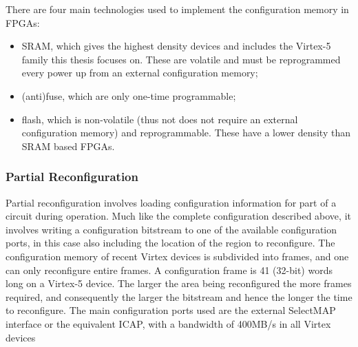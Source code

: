 \documentclass[12pt,final,oneside]{dwThesis} %
\begin{document}
    There are four main
   technologies used to implement the configuration memory in \glspl{FPGA}:
   \begin{itemize}
      \item \gls{SRAM}, which gives the highest density devices and includes
            the Virtex-5 family this thesis focuses on. These are volatile and
            must be reprogrammed every power up from an external configuration
            memory;
      \item (anti)fuse, which are only one-time programmable;
      \item flash, which is non-volatile (thus not does not require an external
            configuration memory) and reprogrammable. These have a lower
            density than \gls{SRAM} based \glspl{FPGA}\cite{FPGAArch}.
      \end{itemize} \subsubsection{Partial Reconfiguration} Partial
      reconfiguration involves loading configuration information for part of a
      circuit during operation. Much like the complete configuration described
      above, it involves writing a configuration bitstream to one of the
      available configuration ports, in this case also including the location
      of the region to reconfigure. The configuration memory of recent Virtex
      devices is subdivided into frames, and one can only reconfigure entire
      frames. A configuration frame is 41 (32-bit) words long on a Virtex-5
      device. The larger the area being reconfigured the more frames required,
      and consequently the larger the bitstream and hence the longer the time
      to reconfigure. The main configuration ports used are the external
      SelectMAP interface or the equivalent \gls{ICAP}, with a bandwidth of
      400MB/s in all Virtex devices \cite{XCell33,DiesselChange}
\end{document}
